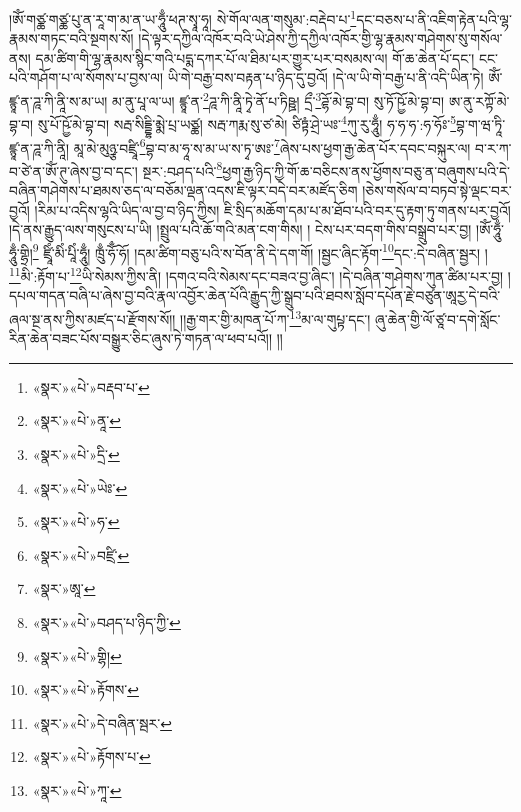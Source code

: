 །ཨོཾ་གཙྪ་གཙྪ་པུ་ན་རཱ་ག་མ་ན་ཡ་ཧཱུྃ་ཕཊ་སྭཱ་ཧཱ། སེ་གོལ་ལན་གསུམ་:བརྡེབ་པ་\footnote{«སྣར་»«པེ་»བརྡབ་པ་}དང་བཅས་པ་ནི་འཇིག་རྟེན་པའི་ལྷ་རྣམས་གཏང་བའི་སྔགས་སོ། །དེ་ལྟར་དཀྱིལ་འཁོར་བའི་ཡེ་ཤེས་ཀྱི་དཀྱིལ་འཁོར་གྱི་ལྷ་རྣམས་གཤེགས་སུ་གསོལ་ནས། དམ་ཚིག་གི་ལྷ་རྣམས་སྙིང་གའི་པདྨ་དཀར་པོ་ལ་ཐིམ་པར་གྱུར་པར་བསམས་ལ། གོ་ཆ་ཆེན་པོ་དང་། ངང་པའི་གཤོག་པ་ལ་སོགས་པ་བྱས་ལ། ཡི་གེ་བརྒྱ་བས་བརྟན་པ་ཉིད་དུ་བྱའོ། །དེ་ལ་ཡི་གེ་བརྒྱ་པ་ནི་འདི་ཡིན་ཏེ། ཨོཾ་ཛྙཱ་ན་ཌཱ་ཀི་ནཱི་ས་མ་ཡ། མ་ནུ་པཱ་ལ་ཡ། ཛྙཱ་ན་\footnote{«སྣར་»«པེ་»ནཱ་}ཌཱ་ཀི་ནཱི་ཏྭེ་ནོ་པ་ཏིཥྛ། དྲྀ་\footnote{«སྣར་»«པེ་»དྲི་}ཌྷོ་མེ་བྷ་བ། སུ་ཏོ་ཥྱོ་མེ་བྷ་བ། ཨ་ནུ་རཀྟོ་མེ་བྷ་བ། སུ་པོ་ཥྱོ་མེ་བྷ་བ། སརྦ་སིདྡྷི་མྨེ་པྲ་ཡཙྪ། སརྦ་ཀརྨ་སུ་ཙ་མེ། ཙིཏྟཾ་ཤྲེ་ཡཿ་\footnote{«སྣར་»«པེ་»ཡེཿ་}ཀུ་རུ་ཧཱུྃ། ཧ་ཧ་ཧ་:ཧ་ཧོཿ་\footnote{«སྣར་»«པེ་»ཧ་}བྷ་ག་ཝ་ཏཱི་ཛྙཱ་ན་ཌཱ་ཀི་ནཱི། མཱ་མེ་མུཉྩ་བཛྲཱི་\footnote{«སྣར་»«པེ་»བཛྲི་}བྷ་བ་མ་ཧཱ་ས་མ་ཡ་ས་ཏྭ་ཨཿ་\footnote{«སྣར་»ཨཱ་}ཞེས་པས་ཕྱག་རྒྱ་ཆེན་པོར་དབང་བསྐུར་ལ། བ་ར་ཀ་བ་ཙེ་ན་ཨོཾ་ཊུ་ཞེས་བྱ་བ་དང་། སྔར་:བཤད་པའི་\footnote{«སྣར་»«པེ་»བཤད་པ་ཉིད་ཀྱི་}ཕྱག་རྒྱ་ཉིད་ཀྱི་གོ་ཆ་བཅིངས་ནས་ཕྱོགས་བཅུ་ན་བཞུགས་པའི་དེ་བཞིན་གཤེགས་པ་ཐམས་ཅད་ལ་བཅོམ་ལྡན་འདས་ཇི་ལྟར་བདེ་བར་མཛོད་ཅིག །ཅེས་གསོལ་བ་བཏབ་སྟེ་ལྡང་བར་བྱའོ། །རིམ་པ་འདིས་ལྷའི་ཡིད་ལ་བྱ་བ་ཉིད་ཀྱིས། ཇི་སྲིད་མཆོག་དམ་པ་མ་ཐོབ་པའི་བར་དུ་རྟག་ཏུ་གནས་པར་བྱའོ། །དེ་ནས་རྒྱུད་ལས་གསུངས་པ་ཡི། །སྤྲུལ་པའི་ཆོ་གའི་མན་ངག་གིས། །
ངེས་པར་བདག་གིས་བསྒྲུབ་པར་བྱ། །ཨོཾ་ཧཱུྃ་ཧཱུྃ་གྷྲི།\footnote{«སྣར་»«པེ་»གྷི།} ཛྲཱིཾ་མིཾ་པཱིཾ་ཧཱུྃ། ཁྲུྃ་ཧོྃ་ཧོ། །དམ་ཚིག་བཅུ་པའི་ས་བོན་ནི་དེ་དག་གོ། །སྦྱང་ཞིང་རྟོག་\footnote{«སྣར་»«པེ་»རྟོགས་}དང་:དེ་བཞིན་སྦྱར། །\footnote{«སྣར་»«པེ་»དེ་བཞིན་སྦར་}མི་:རྟོག་པ་\footnote{«སྣར་»«པེ་»རྟོགས་པ་}ཡི་སེམས་ཀྱིས་ནི། །དགའ་བའི་སེམས་དང་བཟའ་བྱ་ཞིང་། །དེ་བཞིན་གཤེགས་ཀུན་ཚིམ་པར་བྱ། །དཔལ་གདན་བཞི་པ་ཞེས་བྱ་བའི་རྣལ་འབྱོར་ཆེན་པོའི་རྒྱུད་ཀྱི་སྒྲུབ་པའི་ཐབས་སློབ་དཔོན་རྗེ་བཙུན་ཨཱརྱ་དེ་བའི་ཞལ་སྔ་ནས་ཀྱིས་མཛད་པ་རྫོགས་སོ།། །།རྒྱ་གར་གྱི་མཁན་པོ་ཀ་\footnote{«སྣར་»«པེ་»ཀཱ་}མ་ལ་གུཔྟ་དང་། ཞུ་ཆེན་གྱི་ལོ་ཙཱ་བ་དགེ་སློང་རིན་ཆེན་བཟང་པོས་བསྒྱུར་ཅིང་ཞུས་ཏེ་གཏན་ལ་ཕབ་པའོ།། །།